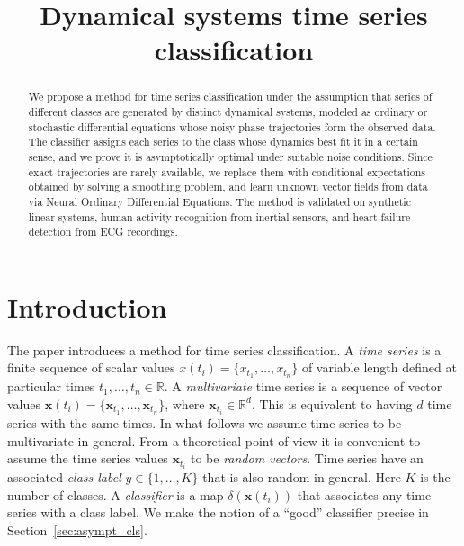 \documentclass[referee, pdflatex, sn-mathphys-num]{sn-jnl}
\theoremstyle{definition}
\theoremstyle{plain}
\newcommand{\bx}{\ensuremath{\mathbf{x}}}
\begin{document}
	
	\title{Dynamical systems time series classification}
	
	\author*[1]{ }
	\author*[2]{ }
	
	
	\maketitle
	
	\begin{abstract}
		
		We propose a method for time series classification under the assumption that series of different classes are generated by distinct dynamical systems, modeled as ordinary or stochastic differential equations whose noisy phase trajectories form the observed data. The classifier assigns each series to the class whose dynamics best fit it in a certain sense, and we prove it is asymptotically optimal under suitable noise conditions. Since exact trajectories are rarely available, we replace them with conditional expectations obtained by solving a smoothing problem, and learn unknown vector fields from data via Neural Ordinary Differential Equations. The method is validated on synthetic linear systems, human activity recognition from inertial sensors, and heart failure detection from ECG recordings.
		
	\end{abstract}
	
	\section{Introduction}\label{Intro}
	
	The paper introduces a method for time series classification. A \emph{time series} is a finite sequence of scalar values $x(t_i)= \{ x_{t_1}, \ldots, x_{t_n} \}$ of variable length defined at particular times $t_1, \ldots, t_n \in \mathbb{R}$. A \emph{multivariate} time series is a sequence of vector values $\bx(t_i)= \{\bx_{t_1}, \ldots, \bx_{t_n}\}$, where $\bx_{t_i} \in \mathbb{R}^d$. This is equivalent to having $d$ time series with the same times. In what follows we assume time series to be multivariate in general. From a theoretical point of view it is convenient to assume the time series values $\bx_{t_i}$ to be \emph{random vectors}. Time series have an associated \emph{class label} $y \in \{1, \ldots, K\}$ that is also random in general. Here $K$ is the number of classes. A \emph{classifier} is a map $\delta(\bx(t_i))$ that associates any time series with a class label. We make the notion of a ``good'' classifier precise in Section~\ref{sec:asympt_cls}.
	
\end{document}
